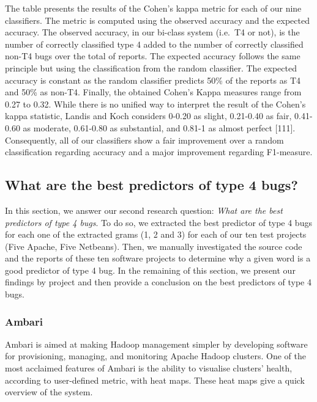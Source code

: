 \documentclass[12pt]{report}
\begin{document}
The table presents the results of the Cohen's kappa metric for each of
our nine classifiers. The metric is computed using the observed accuracy
and the expected accuracy. The observed accuracy, in our bi-class system
(i.e.~T4 or not), is the number of correctly classified type 4 added to
the number of correctly classified non-T4 bugs over the total of
reports. The expected accuracy follows the same principle but using the
classification from the random classifier. The expected accuracy is
constant as the random classifier predicts 50\% of the reports as T4 and
50\% as non-T4. Finally, the obtained Cohen's Kappa measures range from
0.27 to 0.32. While there is no unified way to interpret the result of
the Cohen's kappa statistic, Landis and Koch considers 0-0.20 as slight,
0.21-0.40 as fair, 0.41-0.60 as moderate, 0.61-0.80 as substantial, and
0.81-1 as almost perfect {[}111{]}. Consequently, all of our classifiers
show a fair improvement over a random classification regarding accuracy
and a major improvement regarding F1-measure.

\subsection{What are the best predictors of type 4
bugs?}\label{what-are-the-best-predictors-of-type-4-bugs}

In this section, we answer our second research question: \emph{What are
the best predictors of type 4 bugs}. To do so, we extracted the best
predictor of type 4 bugs for each one of the extracted grams (1, 2 and
3) for each of our ten test projects (Five Apache, Five Netbeans). Then,
we manually investigated the source code and the reports of these ten
software projects to determine why a given word is a good predictor of
type 4 bug. In the remaining of this section, we present our findings by
project and then provide a conclusion on the best predictors of type 4
bugs.

\subsubsection{Ambari}\label{ambari}

Ambari is aimed at making Hadoop management simpler by developing
software for provisioning, managing, and monitoring Apache Hadoop
clusters. One of the most acclaimed features of Ambari is the ability to
visualise clusters' health, according to user-defined metric, with heat
maps. These heat maps give a quick overview of the system.
\end{document}
